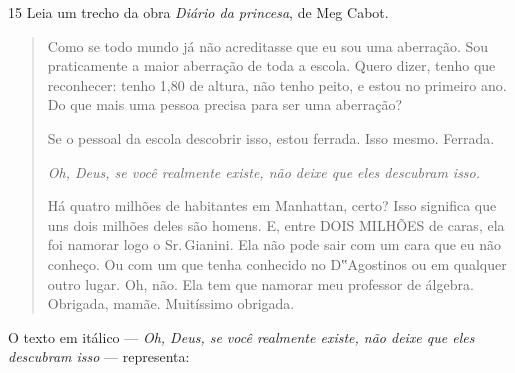 
\num{15} Leia um trecho da obra \emph{Diário da princesa}, de Meg Cabot.

\begin{quote}
\noindent Como se todo mundo já não acreditasse que eu sou uma aberração. Sou
praticamente a maior aberração de toda a escola. Quero dizer, tenho que
reconhecer: tenho 1,80 de altura, não tenho peito, e estou no primeiro
ano. Do que mais uma pessoa precisa para ser uma aberração?

Se o pessoal da escola descobrir isso, estou ferrada. Isso mesmo.
Ferrada.

\textit{Oh, Deus, se você realmente existe, não deixe que eles descubram
isso.}

Há quatro milhões de habitantes em Manhattan, certo? Isso significa que
uns dois milhões deles são homens. E, entre DOIS MILHÕES de caras, ela
foi namorar logo o Sr.\,Gianini. Ela não pode sair com um cara que eu não
conheço. Ou com um que tenha conhecido no D‟Agostinos ou em qualquer
outro lugar. Oh, não. Ela tem que namorar meu professor de álgebra.
Obrigada, mamãe. Muitíssimo obrigada.

\end{quote}

\noindent O texto em itálico — \emph{Oh, Deus, se você realmente existe, não
deixe que eles descubram isso} — representa:

